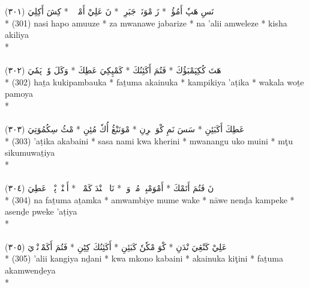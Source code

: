 \documentclass[a4paper, 12pt]{report}
\begin{document}
\begin{center}
\textarabic{(٣٠١) \textcolor{mygreen}{نَسِ هَپٗ أَمُؤُزٖ  * زَ مْوَنَوٖ جَبَرِزٖ  * نَ عَلِيْ أَمْوٖلٖزٖ  * كِشَ أَكِلِيَ }} \\* 
(301) nasi hapo amuuze  * za mwanawe jabarize  * na 'alii amweleze  * kisha akiliya  \\* 
 \\ 
\\[8mm] 

\textarabic{(٣٠٢) \textcolor{mygreen}{هَتَ كُكِپَمْبَؤُكَ  * فَتُمَ أَكَئِنُكَ  * كَمْپِكِيَ عَطِكَ  * وَكَلَ وٗتٖ پَمٗيَ }} \\* 
(302) haṯa kukipambauka  * faṯuma akainuka  * kampikiya 'aṭika  * wakala woṯe pamoya  \\* 
 \\ 
\\[8mm] 

\textarabic{(٣٠٣) \textcolor{mygreen}{عَطِكَ أَكَبَئِنِ  * سَسَ نَمِ كْوَ خٖرِنِ  * مْوَنَنْڠُ أُكٗ مُئِنِ  * مْٹُ سِكُمُوَتِيَ }} \\* 
(303) 'aṭika akabaini  * sasa nami kwa kherini  * mwanangu uko muini  * mţu sikumuwaṯiya  \\* 
 \\ 
\\[8mm] 

\textarabic{(٣٠٤) \textcolor{mygreen}{نَ فَتُمَ أَتَمْكَ  * أَمْوَمْبِيٖ مُمٖ وَكٖ  * نَاوٖ نٖنْدَ كَمْپٖكٖ  * أَسٖنْدٖ پْوٖكٖ عَطِيَ }} \\* 
(304) na faṯuma aṯamka  * amwambiye mume wake  * nāwe nenḏa kampeke  * asenḏe pweke 'aṭiya  \\* 
 \\ 
\\[8mm] 

\textarabic{(٣٠٥) \textcolor{mygreen}{عَلِيْ كَنْڠِيَ نْدَنِ  * كْوَ مْكٗنٗ كَبَئِنِ  * أَكَئِنُكَ كِٹِنِ  * فَتُمَ أَكَمْوٖنْدٖيَ }} \\* 
(305) 'alii kangiya nḏani  * kwa mkono kabaini  * akainuka kiţini  * faṯuma akamwenḏeya  \\* 
 \\ 
\\[8mm] 


\end{center}
\end{document}
